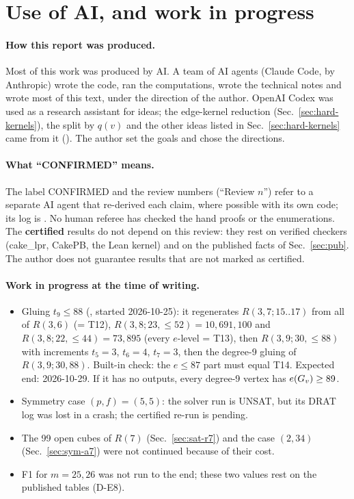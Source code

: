 \section{Use of AI, and work in progress}\label{sec:ai}

\paragraph{How this report was produced.} Most of this work was produced by AI. A team of AI agents (Claude Code, by
Anthropic) wrote the code, ran the computations, wrote the technical notes and wrote most of this text, under the
direction of the author. OpenAI Codex was used as a research assistant for ideas; the edge-kernel reduction
(Sec.~\ref{sec:hard-kernels}), the split by $q(v)$ and the other ideas listed in Sec.~\ref{sec:hard-kernels} came from it
(). The author set the goals and chose the directions.

\paragraph{What ``CONFIRMED'' means.} The label CONFIRMED and the review numbers (``Review $n$'') refer to a separate AI
agent that re-derived each claim, where possible with its own code; its log is . No human referee
has checked the hand proofs or the enumerations. The \textbf{certified} results do not depend on this review: they rest on
verified checkers (cake\_lpr, CakePB, the Lean kernel) and on the published facts of Sec.~\ref{sec:pub}. The author
does not guarantee results that are not marked as certified.

\paragraph{Work in progress at the time of writing.}
\begin{itemize}
\item Gluing $t_9 \le 88$ (, started 2026-10-25): it regenerates $R(3,7;15..17)$ from all of $R(3,6)$
  (= \cite{GR} T12), $R(3,8;23,{\le}52) = 10{,}691{,}100$ and $R(3,8;22,{\le}44) = 73{,}895$ (every $e$-level = \cite{GR} T13), then
  $R(3,9;30,{\le}88)$ with increments $t_5 = 3$, $t_6 = 4$, $t_7 = 3$, then the degree-9 gluing of $R(3,9;30,88)$. Built-in check:
  the $e \le 87$ part must equal \cite{GR} T14. Expected end: 2026-10-29. If it has no outputs, every degree-9 vertex has
  $e(G_{v}) \ge 89$.
\item Symmetry case $(p, f) = (5, 5)$: the solver run is UNSAT, but its DRAT log was lost in a crash; the certified re-run
  is pending.
\item The 99 open cubes of $R(7)$ (Sec.~\ref{sec:sat-r7}) and the case $(2,34)$ (Sec.~\ref{sec:sym-a7}) were not continued
  because of their cost.
\item F1 for $m = 25, 26$ was not run to the end; these two values rest on the published tables (D-E8).
\end{itemize}
